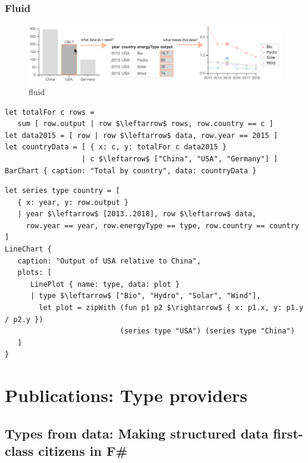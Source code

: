 \documentclass[fleqn,11pt]{report}
\theoremstyle{definition}
\begin{document}
\newpage

\section{Fluid}

\begin{figure}[t]
\hspace{-3em}\includegraphics[scale=0.7]{img/fluid.png}
\caption{fluid}
\label{fig:gap}
\end{figure}

\begin{lstlisting}[language=fluid,mathescape=true]
let totalFor c rows =
   sum [ row.output | row $\leftarrow$ rows, row.country == c ]
let data2015 = [ row | row $\leftarrow$ data, row.year == 2015 ]
let countryData = [ { x: c, y: totalFor c data2015 }
                  | c $\leftarrow$ ["China", "USA", "Germany"] ]
BarChart { caption: "Total by country", data: countryData }
\end{lstlisting}

\begin{lstlisting}[language=fluid,mathescape=true]
let series type country = [
   { x: year, y: row.output }
   | year $\leftarrow$ [2013..2018], row $\leftarrow$ data,
     row.year == year, row.energyType == type, row.country == country ]
LineChart {
   caption: "Output of USA relative to China",
   plots: [
      LinePlot { name: type, data: plot }
      | type $\leftarrow$ ["Bio", "Hydro", "Solar", "Wind"],
        let plot = zipWith (fun p1 p2 $\rightarrow$ { x: p1.x, y: p1.y / p2.y })
                           (series type "USA") (series type "China")
   ]
}
\end{lstlisting}

\part{Publications: Type providers}
\label{part:providers}

\chapter{Types from data: Making structured data first-class citizens in F\#}
\label{ch:fsdata}
\end{document}
